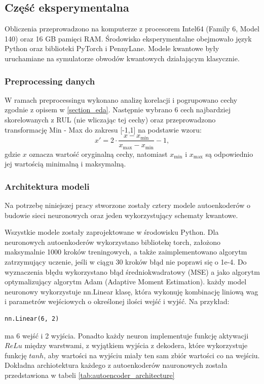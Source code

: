 \subsection{Część eksperymentalna}
Obliczenia przeprowadzono na komputerze z procesorem Intel64 (Family 6, Model 140) oraz 16 GB pamięci RAM. Środowisko eksperymentalne obejmowało język Python oraz biblioteki PyTorch i PennyLane. Modele kwantowe były uruchamiane na symulatorze obwodów kwantowych działającym klasycznie.

\subsubsection{Preprocessing danych}
W ramach preprocessingu wykonano analizę korelacji i pogrupowano cechy zgodnie z opisem w \ref{section_eda}. Następnie wybrano 6 cech najbardziej skorelowanych z RUL (nie wliczając tej cechy) oraz przeprowadzono transformację Min - Max do zakresu [-1,1] na podstawie wzoru:
\[
x' = 2 \cdot \frac{x - x_{\min}}{x_{\max} - x_{\min}} - 1,
\]
gdzie $x$ oznacza wartość oryginalną cechy, natomiast $x_{\min}$ i $x_{\max}$ są odpowiednio jej wartością minimalną i maksymalną.

\subsubsection{Architektura modeli}
Na potrzebę niniejszej pracy stworzone zostały cztery modele autoenkoderów o budowie sieci neuronowych oraz jeden wykorzystujący schematy kwantowe.

Wszystkie modele zostały zaprojektowane w środowisku Python.
Dla neuronowych autoenkoderów wykorzystano bibliotekę torch, założono maksymalnie 1000 kroków treningowych, a także zaimplementowano algorytm zatrzymujący uczenie, jeśli w ciągu 30 kroków błąd nie poprawi się o 1e-4. Do wyznaczenia błędu wykorzystano błąd średniokwadratowy (MSE) a jako algorytm optymalizujący algorytm Adam (Adaptive Moment Estimation). 
każdy model neuronowy wykorzystuje nn.Linear klasę, która wykonuję kombinację liniową wag i parametrów wejściowych o określonej ilości wejść i wyjść. Na przykład:
\begin{verbatim}
nn.Linear(6, 2)    
\end{verbatim}
ma 6 wejść i 2 wyjścia.
Ponadto każdy neuron implementuje funkcję aktywacji $ReLu$ między warstwami, z wyjątkiem wyjścia z dekodera, które wykorzystuje funkcję $tanh$, aby wartości na wyjściu miały ten sam zbiór wartości co na wejściu. Dokładna archiotektura każdego z autoenkoderów nauronowych została przedstawiona w tabeli \ref{tab:autoencoder_architecture}\\

